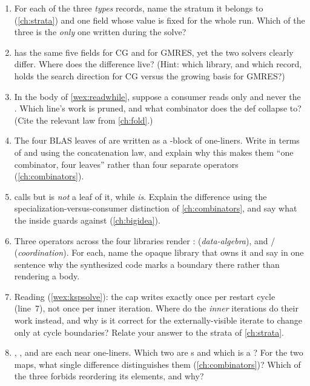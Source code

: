 \exercisessection
\begin{enumerate}[nosep]
  \item For each of the three \emph{types} records, name the stratum it belongs to
  (\cref{ch:strata}) and one field whose value is fixed for the whole run. Which of
  the three is the \emph{only} one written during the solve?
  \item {} has the same five fields for CG and for GMRES, yet the two
  solvers clearly differ. Where does the difference live? (Hint: which library, and
  which record, holds the search direction for CG versus the growing basis for
  GMRES?)
  \item In the  body of \cref{wex:readwhile}, suppose a
  consumer reads only  and never the . Which
  line's work is pruned, and what combinator does the def collapse to? (Cite the
  relevant law from \cref{ch:fold}.)
  \item The four BLAS leaves of  are written as a
  -block of one-liners. Write  in terms of 
  and  using the concatenation law, and explain why this makes them ``one
  combinator, four leaves'' rather than four separate operators (\cref{ch:combinators}).
  \item {} calls  but is \emph{not} a leaf of it,
  while  \emph{is}. Explain the difference using the
  specialization-versus-consumer distinction of \cref{ch:combinators}, and say what
  the  inside  guards against (\cref{ch:bigidea}).
  \item Three operators across the four libraries render :
   (\emph{data-algebra}), and  /
   (\emph{coordination}). For each, name the opaque library
  that owns it and say in one sentence why the synthesized code marks a boundary
  there rather than rendering a body.
  \item Reading  (\cref{wex:kspsolve}): the cap writes
   exactly once per restart cycle (line~7), not once per inner
  iteration. Where do the \emph{inner} iterations do their work instead, and why is
  it correct for the externally-visible iterate to change only at cycle boundaries?
  Relate your answer to the strata of \cref{ch:strata}.
  \item {}, , and  are
  each near one-liners. Which two are s and which is a ? For the
  two maps, what single difference distinguishes them (\cref{ch:combinators})? Which
  of the three forbids reordering its elements, and why?
\end{enumerate}

